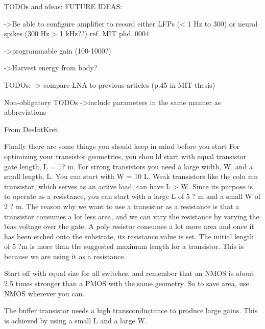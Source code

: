 TODOs and ideas:
  FUTURE IDEAS:
  {
    ->Be able to configure amplifier to record either LFPs (< 1 Hz to 300) or neural spikes (300 Hz > 1 kHz??)
    ref. MIT phd..0004
    
    ->programmable gain (100-1000?)
    
    ->Harvest energy from body?
   }
    
  TODOs:
  {
    -> compare LNA to previous articles (p.45 in MIT-thesis) 
  }
  
  Non-obligatory TODOs
  {
    ->include parameters in the same manner as abbreviations
  }
  
  
  From DesIntKret
  {
    Finally there are some things you should keep in mind before you start 
    For  optimizing  your  transistor  geometries,  you  shou ld  start  with  equal  transistor  gate  length, 
    L = 1? m.  For  strong  transistors  you  need  a  large  width,  W,  and  a  small  length,  L.  You  can start  with  W = 10 L.  Weak  transistors  like  the  colu
    mn  transistor,  which  serves  as  an  active load, can have L > W. Since its purpose is to operate as a resistance, you can start with a large 
    L of 5 ? m and a small W of 2 ? m. The reason why we want to use a transistor as a resistance is that a transistor consumes a lot less area, and 
    we can vary the resistance by varying the bias voltage  over  the  gate.  A  poly  resistor  consumes  a  lot  more  area  and  once  it  has  been  etched 
    onto  the  substrate,  its  resistance  value  is  set.  The  initial  length  of  5 ?m  is  more  than  the suggested maximum length for a transistor. This is 
    because we are using it as a resistance. 

    Start  off  with  equal  size  for  all  switches,  and  remember  that  an  NMOS  is  about  2.5  times 
    stronger  than  a  PMOS  with  the  same  geometry.  So  to save  area,  use  NMOS  wherever  you can. 

    The  buffer  transistor  needs  a  high  transconductance to  produce  large  gains.  This  is  achieved 
    by using a small L and a large W. 
  }